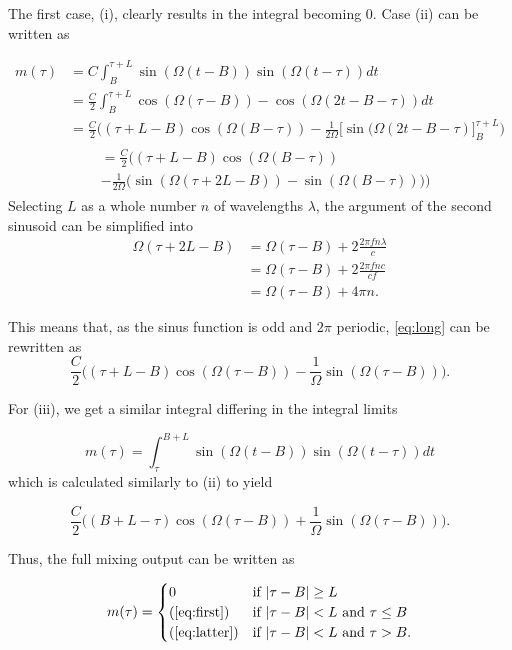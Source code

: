 \begin{appendices}
The first case, (i), clearly results in the integral becoming 0. Case (ii) can be written as

\begin{align}
	m(\tau)
	&= C\int_{B}^{\tau+L}\sin(\Omega(t-B))\sin(\Omega(t-\tau))dt \\
	&= \frac{C}{2}\int_B^{\tau+L} \cos(\Omega(\tau-B)) - \cos(\Omega(2t - B - \tau))dt \\
	&= \frac{C}{2}\Big( (\tau+L-B)\cos(\Omega(B-\tau))
	- \frac{1}{2\Omega}\Big[ \sin(\Omega(2t-B-\tau) \Big]_{B}^{\tau+L} \Big)	
\end{align}
\begin{align}
	\begin{split}
		&= \frac{C}{2}\Big((\tau + L - B)\cos(\Omega(B-\tau)) \\ \label{eq:long}
		&- \frac{1}{2\Omega}\big(
		\sin(\Omega(\tau + 2L - B))
		- \sin(\Omega(B-\tau))
		\big)\Big)
	\end{split}
\end{align}
Selecting $L$ as a whole number $n$ of wavelengths $\lambda$, the argument of the second sinusoid can be simplified into
\begin{align}
	\Omega(\tau + 2L - B) 
	&= \Omega(\tau - B) + 2\frac{2\pi f n\lambda}{c} \\
	&= \Omega(\tau - B) + 2\frac{2\pi f n c}{c f} \\
	&= \Omega(\tau - B) + 4\pi n.
\end{align}

This means that, as the sinus function is odd and $2\pi$ periodic, \eqref{eq:long} can be rewritten as 
\begin{equation}\label{eq:first}
	 \frac{C}{2}\Big( (\tau+L-B)\cos(\Omega(\tau - B)) 
	- \frac{1}{\Omega}\sin(\Omega(\tau - B))\Big).
\end{equation}

For (iii), we get a similar integral differing in the integral limits

\begin{equation}
	m(\tau) 
	= \int_\tau^{B+L}\sin(\Omega(t-B))\sin(\Omega(t-\tau))dt
\end{equation}
which is calculated similarly to (ii) to yield

\begin{equation}\label{eq:latter}
	\frac{C}{2}\Big( (B + L - \tau)\cos(\Omega(\tau - B))
	+ \frac{1}{\Omega}\sin(\Omega(\tau - B))\Big).
\end{equation}

Thus, the full mixing output can be written as

\begin{equation}
	m(\tau) = \begin{cases}
		0 & \text{if $|\tau-B|\geq L$} \\
		\text{(\ref{eq:first})} & \text{if $|\tau-B| < L$ and $\tau \leq B$} \\
		\text{(\ref{eq:latter})} & \text{if $|\tau-B| < L$ and $\tau>B$}.
	\end{cases}
\end{equation}

\end{appendices}


